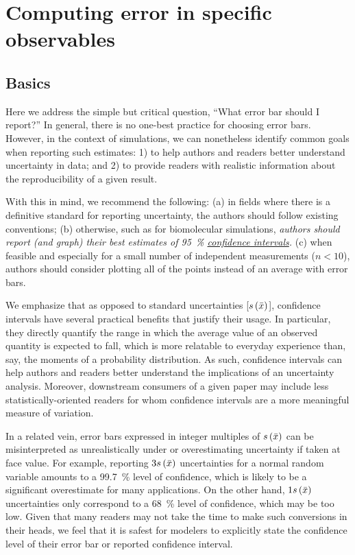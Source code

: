 \section{Computing error in specific observables}
\label{sec:specific}

\subsection{Basics}

Here we address the simple but critical question, ``What error bar should I report?''
In general, there is no one-best practice for choosing error bars. However, in the context of simulations, we can nonetheless identify common goals when reporting such estimates: 1) to help authors and readers better understand uncertainty in data; and 2) to provide readers with realistic information about the reproducibility of a given result.

With this in mind, we recommend the following: (a) in fields where there is a definitive standard for reporting uncertainty, the authors should follow existing conventions; (b) otherwise, such as for biomolecular simulations, \emph{authors should report (and graph) their best estimates of 95~\% \hyperref[def:conf_int]{confidence intervals}.}
(c) when feasible and especially for a small number of independent measurements ($n < 10$), authors should consider plotting all of the points instead of an average with error bars.

We emphasize that as opposed to standard uncertainties [$s\left( \bar{x} \right)$], confidence intervals have several practical benefits that justify their usage. In particular, they directly quantify the range in which the average value of an observed quantity is expected to fall, which is more relatable to everyday experience than, say, the moments of a probability distribution. As such, confidence intervals can help authors and readers better understand the implications of an uncertainty analysis. Moreover, downstream consumers of a given paper may include less statistically-oriented readers for whom confidence intervals are a more meaningful measure of variation.

In a related vein, error bars expressed in integer multiples of $s\left( \bar{x} \right)$ can be misinterpreted as unrealistically under or overestimating uncertainty if taken at face value. For example, reporting $3s\left( \bar{x} \right)$ uncertainties for a normal random variable amounts to a 99.7~\% level of confidence, which is likely to be a significant overestimate for many applications. On the other hand, $1s\left( \bar{x} \right)$ uncertainties only correspond to a 68~\% level of confidence, which may be too low. Given that many readers may not take the time to make such conversions in their heads, we feel that it is safest for modelers to explicitly state the confidence level of their error bar or reported confidence interval.

